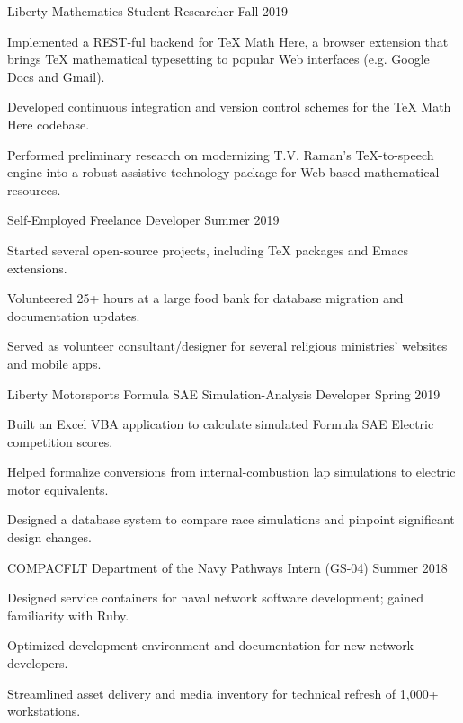 \documentclass{awesome-cv}
\begin{document}
\begin{cventries}
  \cventry
  {Liberty Mathematics}
  {Student Researcher}
  {}
  {Fall 2019}
  {
    \begin{cvitems}
    \item Implemented a REST-ful backend for \TeX{} Math Here, a browser extension
      that brings \TeX{} mathematical typesetting to popular Web interfaces (e.g.
      Google Docs and Gmail).
    \item Developed continuous integration and version control schemes
      for the \TeX{} Math Here codebase.
    \item Performed preliminary research on modernizing T.V. Raman's \TeX{}-to-speech engine
      into a robust assistive technology package for Web-based mathematical resources.
    \end{cvitems}
  }

  \cventry
  {Self-Employed}
  {Freelance Developer}
  {}
  {Summer 2019}
  {
    \begin{cvitems}
    \item Started several open-source projects, including \TeX{} packages and
      Emacs extensions.
    \item Volunteered 25+ hours at a large food bank for database migration and
     documentation updates.
    \item Served as volunteer consultant/designer for several religious ministries'
      websites and mobile apps.
    \end{cvitems}
  }


  \cventry
  {Liberty Motorsports}
  {Formula SAE Simulation-Analysis Developer}
  {}
  {Spring 2019}
  {
    \begin{cvitems}
    \item Built an Excel VBA application to calculate simulated Formula SAE Electric
      competition scores.
    \item Helped formalize conversions from internal-combustion lap simulations
      to electric motor equivalents.
    \item Designed a database system to compare race simulations and
      pinpoint significant design changes.
    \end{cvitems}
  }

  \cventry
  {COMPACFLT}
  {Department of the Navy Pathways Intern (GS-04)}
  {}
  {Summer 2018}
  {
    \begin{cvitems}
    \item Designed service containers for naval network software
      development; gained familiarity with Ruby.
    \item Optimized development environment and documentation for new network
      developers.
    \item Streamlined asset delivery and media inventory for technical refresh of
      1,000+ workstations.
    \end{cvitems}
  }
\end{cventries}
\end{document}
